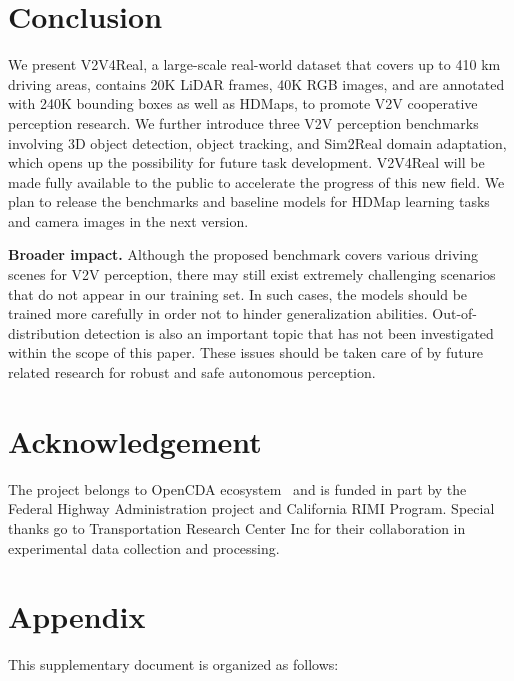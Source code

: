 \documentclass[10pt,twocolumn,letterpaper]{article}
\begin{document}
\section{Conclusion}

We present V2V4Real, a large-scale real-world dataset that covers up to 410 km driving areas, contains 20K LiDAR frames, 40K RGB images, and are annotated with 240K bounding boxes as well as HDMaps, to promote V2V cooperative perception research.
We further introduce three V2V perception benchmarks involving 3D object detection, object tracking, and Sim2Real domain adaptation, which opens up the possibility for future task development.
V2V4Real will be made fully available to the public to accelerate the progress of this new field.
We plan to release the benchmarks and baseline models for HDMap learning tasks and camera images in the next version. 

\noindent\textbf{Broader impact.} Although the proposed benchmark covers various driving scenes for V2V perception, there may still exist extremely challenging scenarios that do not appear in our training set. In such cases, the models should be trained more carefully in order not to hinder generalization abilities. Out-of-distribution detection is also an important topic that has not been investigated within the scope of this paper. These issues should be taken care of by future related research for robust and safe autonomous perception.

\section{Acknowledgement}
The project belongs to OpenCDA ecosystem~\cite{10045043} and is funded in part by  the Federal Highway Administration project and California RIMI Program. Special thanks go to Transportation Research Center Inc for their collaboration in experimental data collection and processing.
{\small


}


\appendix
\section{Appendix}
\label{sec:appendix}

This supplementary document is organized as follows:
\end{document}
